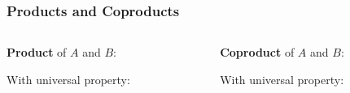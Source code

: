 \documentclass{beamer}
\begin{document}
\begin{frame}[fragile]
    \frametitle{Products and Coproducts}
    \begin{columns}
        \begin{column}{0.5\textwidth}
            \textbf{Product} of $A$ and $B$:
            \begin{center}
            \end{center}
            
            With universal property:
            \begin{center}
            \end{center}
        \end{column}
        \begin{column}{0.5\textwidth}
            \textbf{Coproduct} of $A$ and $B$:
            \begin{center}
            \end{center}
            
            With universal property:
            \begin{center}
            \end{center}
        \end{column}
    \end{columns}
\end{frame}
\end{document}
